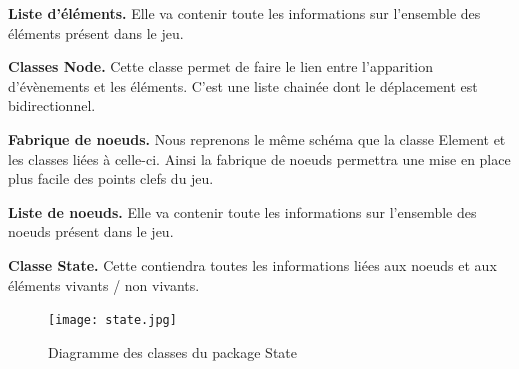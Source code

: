 \documentclass[12pt,a4paper]{report}
\begin{document}
\textbf{Liste d'\'{e}l\'{e}ments.} Elle va contenir toute les informations sur l'ensemble des \'{e}l\'{e}ments pr\'{e}sent dans le jeu. 

\textbf{Classes Node.} Cette classe permet de faire le lien entre l'apparition d'\'{e}v\`{e}nements et les \'{e}l\'{e}ments. C'est une liste chain\'{e}e dont le d\'{e}placement est bidirectionnel.

\textbf{Fabrique de noeuds.} Nous reprenons le m\^{e}me sch\'{e}ma que la classe Element et les classes li\'{e}es \`{a} celle-ci. Ainsi la fabrique de noeuds permettra une mise en place plus facile des points clefs du jeu.

\textbf{Liste de noeuds.} Elle va contenir toute les informations sur l'ensemble des noeuds pr\'{e}sent dans le jeu. 

\textbf{Classe State.} Cette contiendra toutes les informations li\'{e}es aux noeuds et aux \'{e}l\'{e}ments vivants / non vivants.

\newpage

\begin{figure}
\caption{Diagramme des classes du package State}
\texttt{[image: state.jpg]}
\end{figure}
\end{document}
